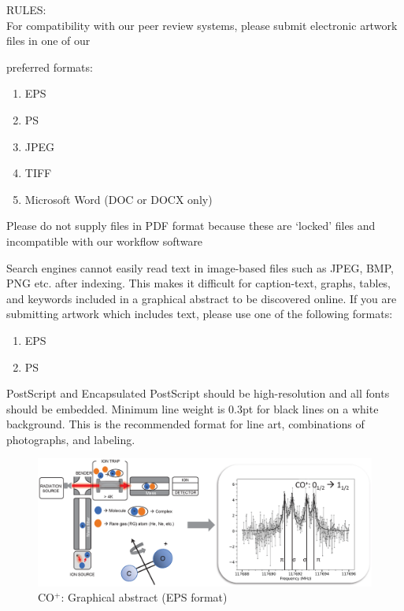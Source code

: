 \documentclass[]{interact}
\begin{document}


RULES:\\ For compatibility with our peer review systems, please submit
electronic artwork files in one of our

preferred formats:
\begin{enumerate}
    \item EPS
    \item  PS
    \item JPEG
    \item TIFF
    \item Microsoft Word (DOC or DOCX only)
\end{enumerate}
Please do not supply files in PDF format because these are ‘locked’ files and incompatible with our
workflow software

Search engines cannot easily read text in image-based files such as JPEG, BMP,
PNG etc. after indexing. This makes it difficult for caption-text, graphs,
tables, and keywords included in a graphical abstract to be discovered online.
If you are submitting artwork which includes text, please use one of the
following formats:
\begin{enumerate}
    \item EPS
    \item  PS
\end{enumerate}

PostScript and Encapsulated PostScript should be high-resolution and all fonts
should be embedded. Minimum line weight is 0.3pt for black lines on a white
background. This is the recommended format for line art, combinations of
photographs, and labeling.

\begin{figure}
    \centering
    \includegraphics[scale=0.5]{GA/CO+_graphicalAbstract.eps}
    \caption{CO$^+$: Graphical abstract (EPS format)}
\end{figure}
\end{document}
